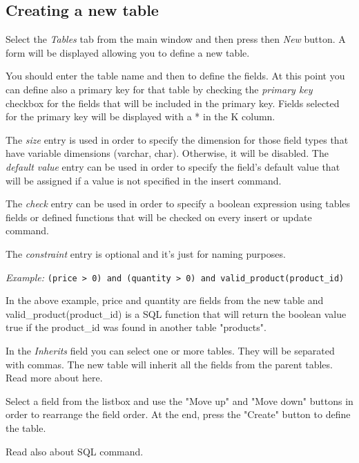\subsection{Creating a new table}
Select the \emph{Tables} tab from the main window and then press then 
\emph{New} button. A form will be displayed allowing you to define a new table.

You should enter the table name and then to define the fields.
At this point you can define also a primary key for that table by checking the 
\emph{primary key} checkbox for the fields that will be included in the primary 
key. Fields selected for the primary key will be displayed with a * in the 
K column.

The \emph{size} entry is used in order to specify the dimension for those field 
types that have variable dimensions (varchar, char). Otherwise, it will be disabled.
The \emph{default value} entry can be used in order to specify the field's default
value that will be assigned if a value is not specified in the insert command.

The \emph{check} entry can be used in order to specify a boolean expression using
tables fields or defined functions that will
be checked on every insert or update command.

The \emph{constraint} entry is optional and it's just for naming purposes.

\textit{Example: }
\texttt{(price > 0) and (quantity > 0) and valid\_product(product\_id)}

In the above example, price and quantity are fields from the new table and
valid\_product(product\_id) is a SQL function that will return the boolean value true
if the product\_id was found in another table "products".

In the \emph{Inherits} field you can select one or more tables. They will be separated
with commas. The new table will inherit all the fields from the parent tables.
Read more about  here.

Select a field from the listbox and use the "Move up" and "Move down" buttons in order to rearrange the field order. At the end, press the "Create" button to define the table.

Read also about  SQL command.
